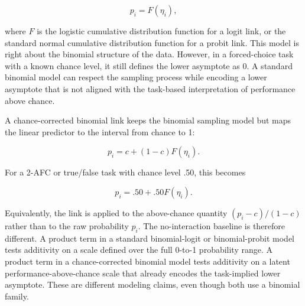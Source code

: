 \documentclass[
  man,
  longtable,
  nolmodern,
  notxfonts,
  notimes,
  colorlinks=true,linkcolor=blue,citecolor=blue,urlcolor=blue]{apa7}
\begin{document}
\[
p_i = F(\eta_i),
\]

where \(F\) is the logistic cumulative distribution function for a logit
link, or the standard normal cumulative distribution function for a
probit link. This model is right about the binomial structure of the
data. However, in a forced-choice task with a known chance level, it
still defines the lower asymptote as 0. A standard binomial model can
respect the sampling process while encoding a lower asymptote that is
not aligned with the task-based interpretation of performance above
chance.

A chance-corrected binomial link keeps the binomial sampling model but
maps the linear predictor to the interval from chance to 1:

\[
p_i = c + (1 - c)F(\eta_i).
\]

For a 2-AFC or true/false task with chance level .50, this becomes

\[
p_i = .50 + .50F(\eta_i).
\]

Equivalently, the link is applied to the above-chance quantity
\((p_i - c)/(1 - c)\) rather than to the raw probability \(p_i\). The
no-interaction baseline is therefore different. A product term in a
standard binomial-logit or binomial-probit model tests additivity on a
scale defined over the full 0-to-1 probability range. A product term in
a chance-corrected binomial model tests additivity on a latent
performance-above-chance scale that already encodes the task-implied
lower asymptote. These are different modeling claims, even though both
use a binomial family.
\end{document}
